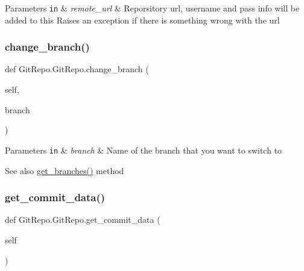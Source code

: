\begin{DoxyParams}[1]{Parameters}
\mbox{\tt in}  & {\em remote\+\_\+url} & Reporsitory url, username and pass info will be added to this Raises an exception if there is something wrong with the url \\
\hline
\end{DoxyParams}
\mbox{\label{class_git_repo_1_1_git_repo_ab1efc90018d20104eaeb8af9ef022c2a}} 
\subsubsection{\texorpdfstring{change\+\_\+branch()}{change\_branch()}}
{\footnotesize\ttfamily def Git\+Repo.\+Git\+Repo.\+change\+\_\+branch (\begin{DoxyParamCaption}\item[{}]{self,  }\item[{}]{branch }\end{DoxyParamCaption})}


\begin{DoxyParams}[1]{Parameters}
\mbox{\tt in}  & {\em branch} & Name of the branch that you want to switch to \\
\hline
\end{DoxyParams}
\begin{DoxySeeAlso}{See also}
\hyperlink{class_git_repo_1_1_git_repo_a6fafbc00a52988697f928dcd1b293d12}{get\+\_\+branches()} method 
\end{DoxySeeAlso}
\mbox{\label{class_git_repo_1_1_git_repo_ab0334d44a728881e4e96342e5c3bc135}} 
\subsubsection{\texorpdfstring{get\+\_\+commit\+\_\+data()}{get\_commit\_data()}}
{\footnotesize\ttfamily def Git\+Repo.\+Git\+Repo.\+get\+\_\+commit\+\_\+data (\begin{DoxyParamCaption}\item[{}]{self }\end{DoxyParamCaption})}



